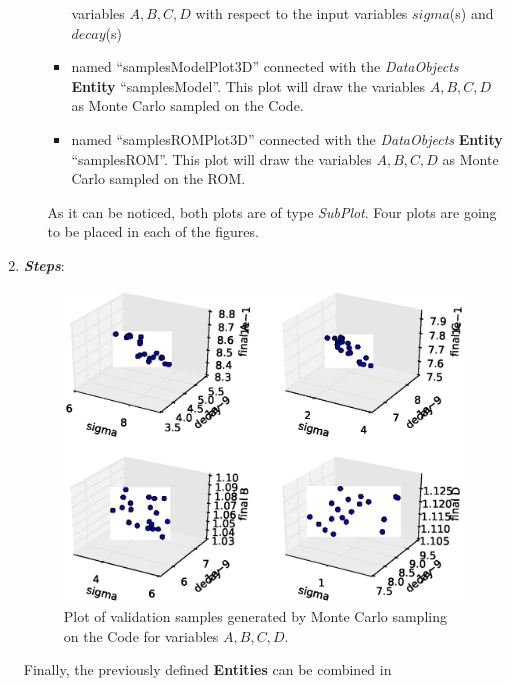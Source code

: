 \begin{enumerate}
\begin{itemize}
\begin{itemize}
      variables $A,B,C,D$ with respect to the input variables $sigma$(s)
      and $decay$(s)
      \item named ``samplesModelPlot3D'' connected with the
      \textit{DataObjects} \textbf{Entity} ``samplesModel''. This plot will draw the
      variables $A,B,C,D$ as Monte Carlo sampled on the Code.
      \item named ``samplesROMPlot3D'' connected with the
      \textit{DataObjects} \textbf{Entity} ``samplesROM''. This plot will draw the
      variables $A,B,C,D$ as Monte Carlo sampled on the ROM.
    \end{itemize}
     As it can be noticed, both plots are of type \textit{SubPlot}. Four plots
     are going to be placed in each of the figures.
  \end{itemize}
   \item \textbf{\textit{Steps}}:
 \begin{figure}[h!]
  \centering
  \includegraphics[scale=0.7]{../../tests/framework/user_guide/ForwardSamplingStrategies/gold/RunDir/SparseGrid/1-samplesModelPlot3D_scatter-scatter-scatter-scatter.eps}
  \caption{Plot of validation samples generated by Monte Carlo sampling on the Code for variables $A,B,C,D$.}
  \label{fig:samplesSparseGridPlotModel}
 \end{figure}
   Finally, the previously defined \textbf{Entities} can be combined in

\end{enumerate}
